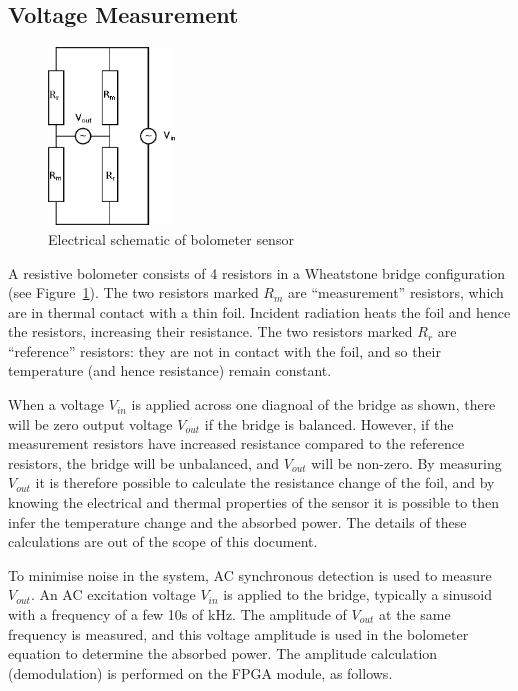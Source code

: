 \documentclass[12pt,a4paper]{article}
\begin{document}
\subsection{Voltage Measurement}
\begin{figure}
  \centering
  \includegraphics[width=0.3\textwidth]{sensor_schematic.eps}
  \caption{Electrical schematic of bolometer sensor}
  \label{fig:sensor}
\end{figure}
A resistive bolometer consists of 4 resistors in a Wheatstone bridge configuration (see Figure~\ref{fig:sensor}). The two resistors marked $R_m$ are ``measurement'' resistors, which are in thermal contact with a thin foil. Incident radiation heats the foil and hence the resistors, increasing their resistance. The two resistors marked $R_r$ are ``reference'' resistors: they are not in contact with the foil, and so their temperature (and hence resistance) remain constant.

When a voltage $V_{in}$ is applied across one diagnoal of the bridge as shown, there will be zero output voltage $V_{out}$ if the bridge is balanced. However, if the measurement resistors have increased resistance compared to the reference resistors, the bridge will be unbalanced, and $V_{out}$ will be non-zero. By measuring $V_{out}$ it is therefore possible to calculate the resistance change of the foil, and by knowing the electrical and thermal properties of the sensor it is possible to then infer the temperature change and the absorbed power. The details of these calculations are out of the scope of this document.

To minimise noise in the system, AC synchronous detection is used to measure $V_{out}$. An AC excitation voltage $V_{in}$ is applied to the bridge, typically a sinusoid with a frequency of a few 10s of kHz. The amplitude of $V_{out}$ at the same frequency is measured, and this voltage amplitude is used in the bolometer equation to determine the absorbed power. The amplitude calculation (demodulation) is performed on the FPGA module, as follows.
\end{document}
